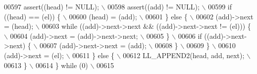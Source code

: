 \begin{DoxyCode}
00597 \textcolor{preprocessor}{    assert((head) != NULL);                                                                    \(\backslash\)}
00598 \textcolor{preprocessor}{    assert((add) != NULL);                                                                     \(\backslash\)}
00599 \textcolor{preprocessor}{    if ((head) == (el)) \{                                                                      \(\backslash\)}
00600 \textcolor{preprocessor}{      (head) = (add);                                                                          \(\backslash\)}
00601 \textcolor{preprocessor}{    \} else \{                                                                                   \(\backslash\)}
00602 \textcolor{preprocessor}{      (add)->next = (head);                                                                    \(\backslash\)}
00603 \textcolor{preprocessor}{      while ((add)->next->next && ((add)->next->next != (el))) \{                               \(\backslash\)}
00604 \textcolor{preprocessor}{        (add)->next = (add)->next->next;                                                       \(\backslash\)}
00605 \textcolor{preprocessor}{      \}                                                                                        \(\backslash\)}
00606 \textcolor{preprocessor}{      if ((add)->next->next) \{                                                                 \(\backslash\)}
00607 \textcolor{preprocessor}{        (add)->next->next = (add);                                                             \(\backslash\)}
00608 \textcolor{preprocessor}{      \}                                                                                        \(\backslash\)}
00609 \textcolor{preprocessor}{    \}                                                                                          \(\backslash\)}
00610 \textcolor{preprocessor}{    (add)->next = (el);                                                                        \(\backslash\)}
00611 \textcolor{preprocessor}{  \} else \{                                                                                     \(\backslash\)}
00612 \textcolor{preprocessor}{    LL\_APPEND2(head, add, next);                                                               \(\backslash\)}
00613 \textcolor{preprocessor}{  \}                                                                                            \(\backslash\)}
00614 \textcolor{preprocessor}{\} while (0)                                                                                    \(\backslash\)}
00615 \textcolor{preprocessor}{}

\end{DoxyCode}
